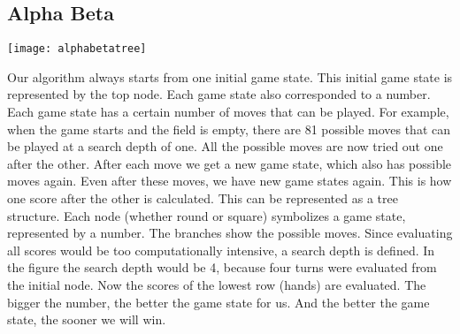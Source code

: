 \subsection{Alpha Beta}
\begin{fixedpic}
	\centering
	\texttt{[image: alphabetatree]}
\end{fixedpic}



Our algorithm always starts from one initial game state. This initial game state is represented by the top node. Each game state also corresponded to a number. Each game state has a certain number of moves that can be played. For example, when the game starts and the field is empty, there are 81 possible moves that can be played at a search depth of one.
All the possible moves are now tried out one after the other. After each move we get a new game state, which also has possible moves again. Even after these moves, we have new game states again. This is how one score after the other is calculated. This can be represented as a tree structure. Each node (whether round or square) symbolizes a game state, represented by a number. The branches show the possible moves. Since evaluating all scores would be too computationally intensive, a search depth is defined. In the figure the search depth would be 4, because four turns were evaluated from the initial node. Now the scores of the lowest row (hands) are evaluated. The bigger the number, the better the game state for us. And the better the game state, the sooner we will win.\\

